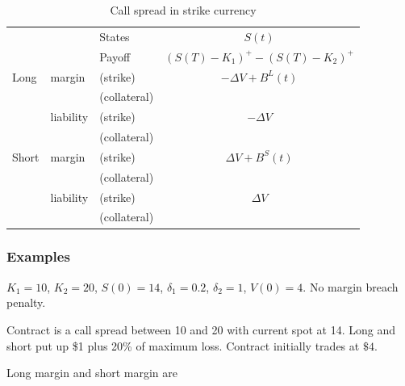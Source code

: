 \documentclass[12pt]{article}
\begin{document}
\begin{table}
\centering
\begin{tabular}{lll|c}
\hline
&  & States & $S(t)$ \\
&  & Payoff &  $(S(T)-K_1)^+ -(S(T)-K_2)^+$\\
\hline
Long      & margin    & (strike)     & $-\Delta V + B^L(t)$  \\
          &           & (collateral) &\\
          & liability & (strike)     & $-\Delta V$\\
          &           & (collateral)&\\
\hline
Short     & margin    & (strike)     & $\Delta V + B^S(t)$ \\
          &           & (collateral) &\\
          & liability & (strike)     & $\Delta V$\\
          &           & (collateral) &\\ 
\hline
\end{tabular}
\caption{Call spread in strike currency}
\label{tab:callspreadstrike}
\end{table}

\subsubsection*{Examples}


$K_1 = 10$, $K_2 = 20$, $S(0)=14$, $\delta_1 =0.2$, $\delta_2= 1$,  $V(0)=4$. No margin breach penalty.

Contract is a call spread between 10 and 20 with current spot at 14. Long and short put up \$1 plus 20\% of maximum loss. Contract initially trades at $\$4$.


Long margin and short margin are
\end{document}
